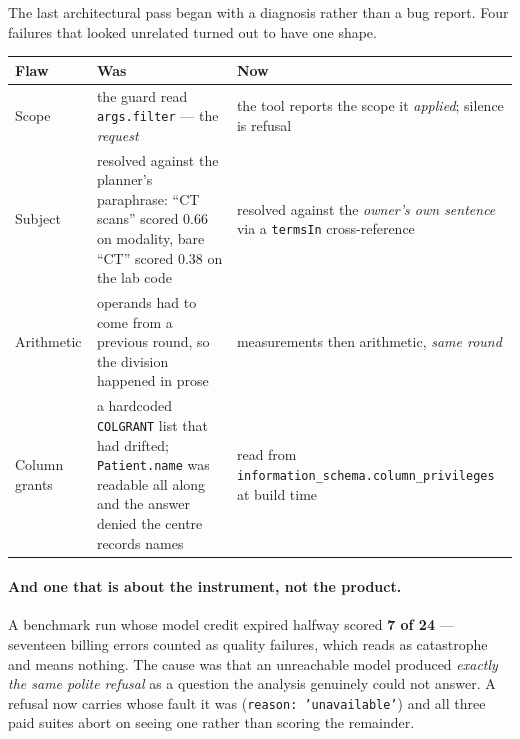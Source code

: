 \documentclass[11pt,a4paper]{report}
\newcommand{\code}[1]{\texttt{\small #1}}
\newenvironment{fitpic}
  {\par\medskip\begin{center}\begin{lrbox}{\fitbox}}
  {\end{lrbox}%
   \ifdim\wd\fitbox>\textwidth \resizebox{\textwidth}{!}{\usebox{\fitbox}}%
   \else \usebox{\fitbox}\fi
   \end{center}\medskip}
\begin{document}
The last architectural pass began with a diagnosis rather than a bug report. Four failures that
looked unrelated turned out to have one shape.

\begin{fitpic}
\end{fitpic}

\begin{center}
\small
\begin{tabular}{@{}p{3.4cm}p{5.6cm}p{5.6cm}@{}}
\toprule
\textbf{Flaw} & \textbf{Was} & \textbf{Now}\\
\midrule
Scope & the guard read \code{args.filter} --- the \emph{request} & the tool reports the scope it
 \emph{applied}; silence is refusal\\
Subject & resolved against the planner's paraphrase: ``CT scans'' scored 0.66 on modality, bare
 ``CT'' scored 0.38 on the lab code & resolved against the \emph{owner's own sentence} via a
 \code{termsIn} cross-reference\\
Arithmetic & operands had to come from a previous round, so the division happened in prose &
 measurements then arithmetic, \emph{same round}\\
Column grants & a hardcoded \code{COLGRANT} list that had drifted; \code{Patient.name} was readable
 all along and the answer denied the centre records names & read from
 \code{information\_schema.column\_privileges} at build time\\
\bottomrule
\end{tabular}
\end{center}

\paragraph{And one that is about the instrument, not the product.} A benchmark run whose model
credit expired halfway scored \textbf{7 of 24} --- seventeen billing errors counted as quality
failures, which reads as catastrophe and means nothing. The cause was that an unreachable model
produced \emph{exactly the same polite refusal} as a question the analysis genuinely could not
answer. A refusal now carries whose fault it was (\code{reason: 'unavailable'}) and all three paid
suites abort on seeing one rather than scoring the remainder.
\end{document}
